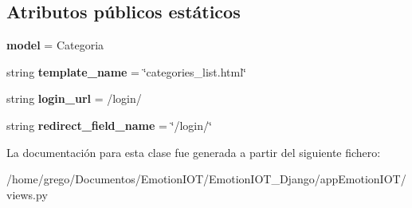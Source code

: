 \subsection*{Atributos públicos estáticos}
\begin{DoxyCompactItemize}
\item 
{\bfseries model} = Categoria\hypertarget{classappEmotionIOT_1_1views_1_1Categories__list_ab7ada2f68a4904a6e59534212fa305b5}{}\label{classappEmotionIOT_1_1views_1_1Categories__list_ab7ada2f68a4904a6e59534212fa305b5}

\item 
string {\bfseries template\+\_\+name} = \char`\"{}categories\+\_\+list.\+html\char`\"{}\hypertarget{classappEmotionIOT_1_1views_1_1Categories__list_a8b4e46945485f1753f5944a64501fa75}{}\label{classappEmotionIOT_1_1views_1_1Categories__list_a8b4e46945485f1753f5944a64501fa75}

\item 
string {\bfseries login\+\_\+url} = \textquotesingle{}/login/\textquotesingle{}\hypertarget{classappEmotionIOT_1_1views_1_1Categories__list_abb3a04cc8be518236e1b4b0a7386911c}{}\label{classappEmotionIOT_1_1views_1_1Categories__list_abb3a04cc8be518236e1b4b0a7386911c}

\item 
string {\bfseries redirect\+\_\+field\+\_\+name} = \char`\"{}/login/\char`\"{}\hypertarget{classappEmotionIOT_1_1views_1_1Categories__list_ae7923db399c087155358445ec5173296}{}\label{classappEmotionIOT_1_1views_1_1Categories__list_ae7923db399c087155358445ec5173296}

\end{DoxyCompactItemize}


La documentación para esta clase fue generada a partir del siguiente fichero\+:\begin{DoxyCompactItemize}
\item 
/home/grego/\+Documentos/\+Emotion\+I\+O\+T/\+Emotion\+I\+O\+T\+\_\+\+Django/app\+Emotion\+I\+O\+T/views.\+py\end{DoxyCompactItemize}
